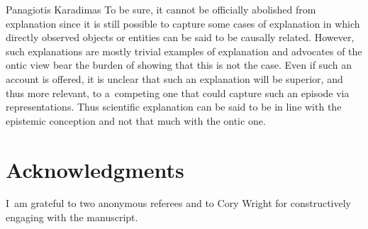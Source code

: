 \begin{artengenv}{Panagiotis Karadimas}
To be sure, it cannot be officially abolished from explanation since it is still possible to capture some cases of explanation in which directly observed objects or entities can be said to be causally related. However, such explanations are mostly trivial examples of explanation and advocates of the ontic view bear the burden of showing that this is not the case. Even if such an account is offered, it is unclear that such an explanation will be superior, and thus more relevant, to a~competing one that could capture such an episode via representations. Thus scientific explanation can be said to be in line with the epistemic conception and not that much with the ontic one.

\section{Acknowledgments }
I~am grateful to two anonymous referees and to Cory Wright for constructively engaging with the manuscript.

\end{artengenv}
